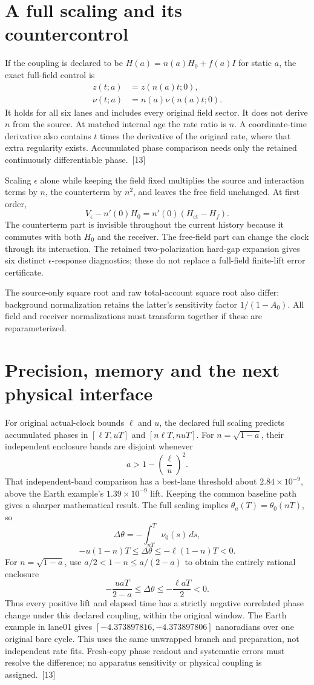 \documentclass[10pt,twocolumn,letterpaper]{article}
\begin{document}
\section{A full scaling and its countercontrol}
If the coupling is declared to be \(H(a)=n(a)H_0+f(a)I\) for static \(a\), the exact full-field control is
\[
\begin{aligned}
z(t;a)&=z(n(a)t;0),\\
\nu(t;a)&=n(a)\nu(n(a)t;0).
\end{aligned}
\]
It holds for all six lanes and includes every original field sector. It does not derive \(n\) from the source. At matched internal age the rate ratio is \(n\). A coordinate-time derivative also contains \(t\) times the derivative of the original rate, where that extra regularity exists. Accumulated phase comparison needs only the retained continuously differentiable phase.~[13]

Scaling \(\epsilon\) alone while keeping the field fixed multiplies the source and interaction terms by \(n\), the counterterm by \(n^2\), and leaves the free field unchanged. At first order,
\[
V_\epsilon-n'(0)H_0=n'(0)(H_{\mathrm{ct}}-H_f).
\]
The counterterm part is invisible throughout the current history because it commutes with both \(H_0\) and the receiver. The free-field part can change the clock through its interaction. The retained two-polarization hard-gap expansion gives six distinct \(\epsilon\)-response diagnostics; these do not replace a full-field finite-lift error certificate.

The source-only square root and raw total-account square root also differ: background normalization retains the latter's sensitivity factor \(1/(1-A_0)\). All field and receiver normalizations must transform together if these are reparameterized.

\section{Precision, memory and the next physical interface}
For original actual-clock bounds \(\ell\) and \(u\), the declared full scaling predicts accumulated phases in \([\ell T,uT]\) and \([n\ell T,nuT]\). For \(n=\sqrt{1-a}\), their independent enclosure bands are disjoint whenever
\[
a>1-\left(\frac{\ell}{u}\right)^2.
\]
That independent-band comparison has a best-lane threshold about \(2.84\times10^{-9}\), above the Earth example's \(1.39\times10^{-9}\) lift. Keeping the common baseline path gives a sharper mathematical result. The full scaling implies \(\theta_a(T)=\theta_0(nT)\), so
\[
\Delta\theta=-\int_{nT}^{T}\nu_0(s)\,ds,
\]
\[
-u(1-n)T\le\Delta\theta\le-\ell(1-n)T<0.
\]
For \(n=\sqrt{1-a}\), use \(a/2<1-n\le a/(2-a)\) to obtain the entirely rational enclosure
\[
-\frac{uaT}{2-a}\le\Delta\theta\le-\frac{\ell aT}{2}<0.
\]
Thus every positive lift and elapsed time has a strictly negative correlated phase change under this declared coupling, within the original window. The Earth example in lane01 gives \([-4.373897816,-4.373897806]\) nanoradians over one original bare cycle. This uses the same unwrapped branch and preparation, not independent rate fits. Fresh-copy phase readout and systematic errors must resolve the difference; no apparatus sensitivity or physical coupling is assigned.~[13]
\end{document}
